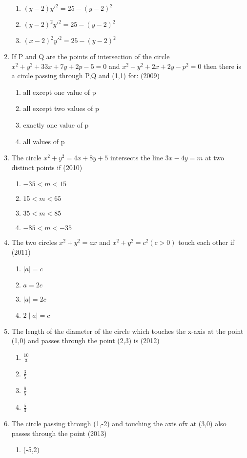 \documentclass[12pt]{article}
\begin{document}
\begin{enumerate}
\begin{enumerate}
\item $(y-2)y'^2=25-(y-2)^2$
\item $(y-2)^2y'^2=25-(y-2)^2$
\item $(x-2)^2y'^2 =25-(y-2)^2$
\end{enumerate}
\item If P and Q are the points of intersection of the circle $x^2+y^2+33x+7y+2p-5=0$ and $x^2+y^2+2x+2y-p^2=0$ then there is a circle passing through P,Q and (1,1) for: (2009)
\begin{enumerate}
\item all except one value of p
\item all except two values of p
\item exactly one value of p
\item all values of p 
\end{enumerate}
\item The circle $x^2+y^2=4x+8y+5$ intersects the line $3x-4y=m$ at two distinct points if (2010)
\begin{enumerate}
\item $-35<m<15$
\item $15<m<65$
\item $35<m<85$
\item $-85<m<-35$ 
\end{enumerate}
\item The two circles $x^2+y^2=ax$ and $x^2+y^2=c^2(c> 0)$ touch each other if (2011)
\begin{enumerate}
\item $\mid a\mid=c$
\item $a=2c$
\item $\mid a\mid=2c$
\item $2\mid a\mid=c$ 
\end{enumerate}
\item The length of the diameter of the circle which touches the x-axis at the point (1,0) and passes through the point (2,3) is (2012)
\begin{enumerate}
\item $\frac{10}{3}$
\item $\frac{3}{5}$
\item $\frac{6}{5}$
\item $\frac{5}{3}$
\end{enumerate}
\item The circle passing through (1,-2) and touching the axis ofx at (3,0) also passes through the point (2013)
\begin{enumerate}
\item (-5,2)

\end{enumerate}
\end{enumerate}
\end{document}
